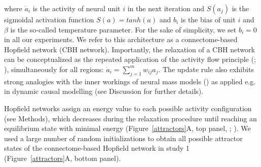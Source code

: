\documentclass{article}
\begin{document}
where $\dot{a}_i$ is the activity of neural unit $i$ in the next iteration and $S(a_j)$ is the sigmoidal activation function $S(a) = tanh(a)$ and $b_i$ is the bias of unit $i$ and $\beta$ is the so-called temperature parameter. For the sake of simplicity, we set $b_i=0$ in all our experiments. We refer to this architecture as a connectome-based Hopfield network (CBH network).
Importantly, the relaxation of a CBH network can be conceptualized as the repeated application of the activity flow principle (\cite{Cole_2016}; \href{https://doi.org/10.1038/s41467-017-01000-w}{}), simultaneously for all regions: $\dot{a}_i = \sum_{j=1}^m w_{ij}a_j$.
The update rule also exhibits strong analogies with the inner workings of neural mass models  (\cite{Breakspear_2017}) as applied e.g. in dynamic causal modelling (see Discussion for further details).

Hopfield networks assign an energy value to each possible activity configuration (see Methods), which decreases during the relaxation procedure until reaching an equilibrium state with minimal energy (Figure~\ref{attractors}A, top panel, \cite{Hopfield_1982}; \cite{Koiran_1994}).
We used a large number of random initializations to obtain all possible attractor states of the connectome-based Hopfield network in study 1 (Figure~\ref{attractors}A, bottom panel).
\end{document}
